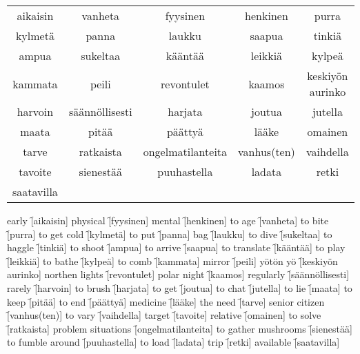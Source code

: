 \begin{center}
  \begin{tabular}{|c c c c c|}
    \hline
    aikaisin & vanheta & fyysinen & henkinen & purra \\
    kylmetä & panna & laukku & saapua & tinkiä \\
    ampua & sukeltaa & kääntää & leikkiä & kylpeä \\
    kammata & peili & revontulet & kaamos & keskiyön aurinko \\
    harvoin & säännöllisesti & harjata & joutua & jutella \\
    maata & pitää & päättyä & lääke & omainen \\
    tarve & ratkaista & ongelmatilanteita & vanhus(ten) & vaihdella \\
    tavoite & sienestää & puuhastella & ladata & retki \\
    saatavilla &&&& \\
    \hline
  \end{tabular}
\end{center}

\begin{questions}
  \begin{multicols}{3}
    \raggedcolumns
    \question early \f[aikaisin]
    \question physical \f[fyysinen]
    \question mental \f[henkinen]
    \question to age \f[vanheta]
    \question to bite \f[purra]
    \question to get cold \f[kylmetä]
    \question to put \f[panna]
    \question bag \f[laukku]
    \question to dive \f[sukeltaa]
    \question to haggle \f[tinkiä]
    \question to shoot  \f[ampua]
    \question to arrive \f[saapua]
    \question to translate \f[kääntää]
    \question to play \f[leikkiä]
    \question to bathe \f[kylpeä]
    \question to comb \f[kammata]
    \question mirror \f[peili]
    \question yötön yö \f[keskiyön aurinko]
    \question northen lights \f[revontulet]
    \question polar night    \f[kaamos]
    \question regularly      \f[säännöllisesti]
    \question rarely         \f[harvoin]
    \question to brush       \f[harjata]
    \question to get         \f[joutua]
    \question to chat        \f[jutella]
    \question to lie         \f[maata]
    \question to keep        \f[pitää]
    \question to end         \f[päättyä]
    \question medicine       \f[lääke]
    \question the need       \f[tarve]
    \question senior citizen \f[vanhus(ten)]
    \question to vary        \f[vaihdella]
    \question target         \f[tavoite]
    \question relative       \f[omainen]
    \question to solve       \f[ratkaista]
    \question problem situations \f[ongelmatilanteita]
    \question to gather mushrooms \f[sienestää]
    \question to fumble around    \f[puuhastella]
    \question to load             \f[ladata]
    \question trip                \f[retki]
    \question available           \f[saatavilla]
  \end{multicols}
\end{questions}
